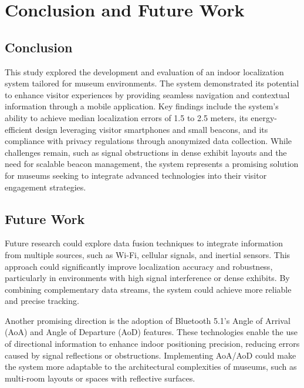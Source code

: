 



\chapter{Conclusion and Future Work}
\label{chap:conclusion}

\section{Conclusion}
This study explored the development and evaluation of an indoor localization system tailored for museum environments. The system demonstrated its potential to enhance visitor experiences by providing seamless navigation and contextual information through a mobile application. Key findings include the system’s ability to achieve median localization errors of 1.5 to 2.5 meters, its energy-efficient design leveraging visitor smartphones and small beacons, and its compliance with privacy regulations through anonymized data collection. While challenges remain, such as signal obstructions in dense exhibit layouts and the need for scalable beacon management, the system represents a promising solution for museums seeking to integrate advanced technologies into their visitor engagement strategies.

\section{Future Work}
Future research could explore data fusion techniques to integrate information from multiple sources, such as Wi-Fi, cellular signals, and inertial sensors. This approach could significantly improve localization accuracy and robustness, particularly in environments with high signal interference or dense exhibits. By combining complementary data streams, the system could achieve more reliable and precise tracking.

Another promising direction is the adoption of Bluetooth 5.1’s Angle of Arrival (AoA) and Angle of Departure (AoD) features. These technologies enable the use of directional information to enhance indoor positioning precision, reducing errors caused by signal reflections or obstructions. Implementing AoA/AoD could make the system more adaptable to the architectural complexities of museums, such as multi-room layouts or spaces with reflective surfaces.

